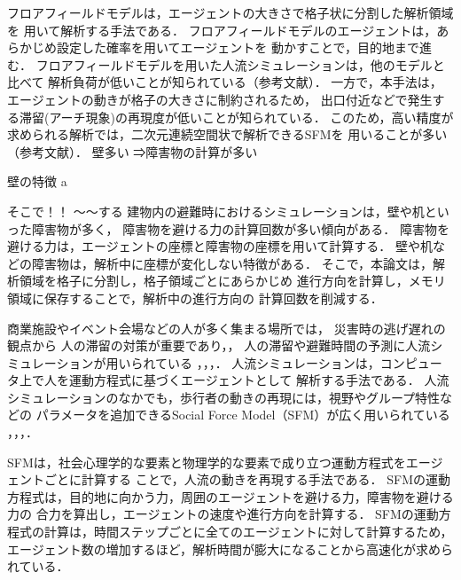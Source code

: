 フロアフィールドモデルは，エージェントの大きさで格子状に分割した解析領域を
用いて解析する手法である．
フロアフィールドモデルのエージェントは，あらかじめ設定した確率を用いてエージェントを
動かすことで，目的地まで進む．
フロアフィールドモデルを用いた人流シミュレーションは，他のモデルと比べて
解析負荷が低いことが知られている（参考文献）．
一方で，本手法は，エージェントの動きが格子の大きさに制約されるため，
出口付近などで発生する滞留(アーチ現象)の再現度が低いことが知られている．
このため，高い精度が求められる解析では，二次元連続空間状で解析できるSFMを
用いることが多い（参考文献）．
壁多い
⇒障害物の計算が多い

壁の特徴
a

そこで！！
～～する
建物内の避難時におけるシミュレーションは，壁や机といった障害物が多く，
障害物を避ける力の計算回数が多い傾向がある．
障害物を避ける力は，エージェントの座標と障害物の座標を用いて計算する．
壁や机などの障害物は，解析中に座標が変化しない特徴がある．
そこで，本論文は，解析領域を格子に分割し，格子領域ごとにあらかじめ
進行方向を計算し，メモリ領域に保存することで，解析中の進行方向の
計算回数を削減する．


商業施設やイベント会場などの人が多く集まる場所では，
災害時の逃げ遅れの観点から
人の滞留の対策が重要であり\cite{taisaku1}，\cite{taisaku2}，
人の滞留や避難時間の予測に人流シミュレーションが用いられている
\cite{sim_jirei1}，\cite{sim_jirei2}，\cite{sim_jirei3}，\cite{sim_jirei8}．
人流シミュレーションは，コンピュータ上で人を運動方程式に基づくエージェントとして
解析する手法である．
人流シミュレーションのなかでも，歩行者の動きの再現には，視野やグループ特性などの
パラメータを追加できるSocial Force Model（SFM）が広く用いられている
\cite{helbing_sfm}，\cite{sfm_ntt}，\cite{sfm_para1}，\cite{intro_gunshu}．

SFMは，社会心理学的な要素と物理学的な要素で成り立つ運動方程式をエージェントごとに計算する
ことで，人流の動きを再現する手法である．
SFMの運動方程式は，目的地に向かう力，周囲のエージェントを避ける力，障害物を避ける力の
合力を算出し，エージェントの速度や進行方向を計算する．
SFMの運動方程式の計算は，時間ステップごとに全てのエージェントに対して計算するため，
エージェント数の増加するほど，解析時間が膨大になることから高速化が求められている．


